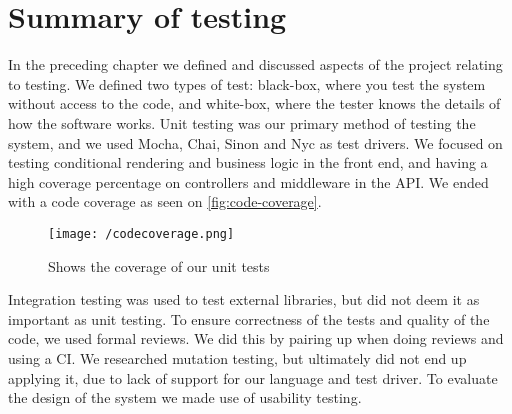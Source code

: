 \section{Summary of testing}
In the preceding chapter we defined and discussed aspects of the project relating to testing.
We defined two types of test: black-box, where you test the system without access to the code, and white-box, where the tester knows the details of how the software works.
Unit testing was our primary method of testing the system, and we used Mocha, Chai, Sinon and Nyc as test drivers.
We focused on testing conditional rendering and business logic in the front end, and having a high coverage percentage on controllers and middleware in the API.
We ended with a code coverage as seen on \autoref{fig:code-coverage}.
\begin{figure}[]
    \texttt{[image: /codecoverage.png]}
     \caption{Shows the coverage of our unit tests}
     \label{fig:code-coverage}
 \end{figure}
Integration testing was used to test external libraries, but did not deem it as important as unit testing.
To ensure correctness of the tests and quality of the code, we used formal reviews.
We did this by pairing up when doing reviews and using a CI.
We researched mutation testing, but ultimately did not end up applying it, due to lack of support for our language and test driver.
To evaluate the design of the system we made use of usability testing.
